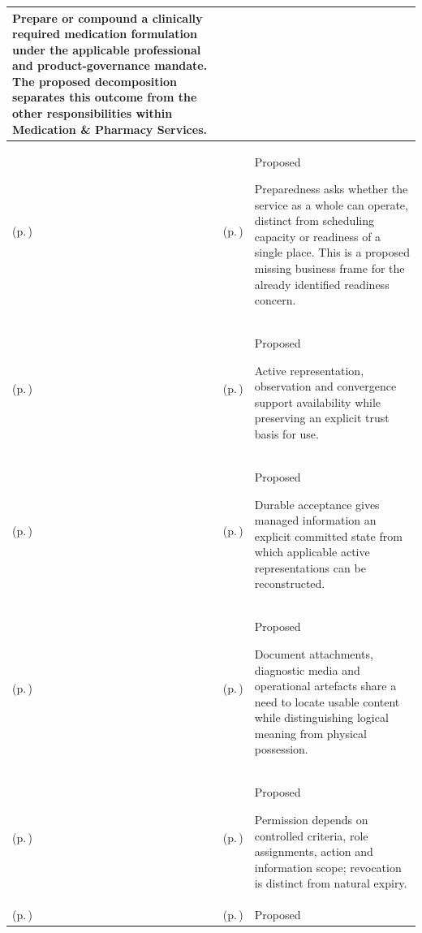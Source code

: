 \begin{longtable}{|>{\raggedright\arraybackslash}p{0.27\TableWidth}|>{\raggedright\arraybackslash}p{0.27\TableWidth}|>{\raggedright\arraybackslash}p{0.46\TableWidth}|}
Prepare or compound a clinically required medication formulation under the applicable professional and product-governance mandate. The proposed decomposition separates this outcome from the other responsibilities within Medication \& Pharmacy Services.\\\hline
\nameref{cap:bc-care-access-coordination} (p.\,\pageref{cap:bc-care-access-coordination}) & \nameref{cap:bc-service-delivery-preparedness-management} (p.\,\pageref{cap:bc-service-delivery-preparedness-management}) & Proposed

Preparedness asks whether the service as a whole can operate, distinct from scheduling capacity or readiness of a single place. This is a proposed missing business frame for the already identified readiness concern.\\\hline
\nameref{cap:ec-04} (p.\,\pageref{cap:ec-04}) & \nameref{cap:ec-active-information-availability} (p.\,\pageref{cap:ec-active-information-availability}) & Proposed

Active representation, observation and convergence support availability while preserving an explicit trust basis for use.\\\hline
\nameref{cap:ec-04} (p.\,\pageref{cap:ec-04}) & \nameref{cap:ec-authoritative-durable-state-establishment} (p.\,\pageref{cap:ec-authoritative-durable-state-establishment}) & Proposed

Durable acceptance gives managed information an explicit committed state from which applicable active representations can be reconstructed.\\\hline
\nameref{cap:ec-04} (p.\,\pageref{cap:ec-04}) & \nameref{cap:ec-binary-content-association-resolution} (p.\,\pageref{cap:ec-binary-content-association-resolution}) & Proposed

Document attachments, diagnostic media and operational artefacts share a need to locate usable content while distinguishing logical meaning from physical possession.\\\hline
\nameref{cap:ec-06} (p.\,\pageref{cap:ec-06}) & \nameref{cap:ec-operation-policy-resolution} (p.\,\pageref{cap:ec-operation-policy-resolution}) & Proposed

Permission depends on controlled criteria, role assignments, action and information scope; revocation is distinct from natural expiry.\\\hline
\nameref{cap:ec-06} (p.\,\pageref{cap:ec-06}) & \nameref{cap:ec-operation-bound-policy-enforcement} (p.\,\pageref{cap:ec-operation-bound-policy-enforcement}) & Proposed


\end{longtable}
